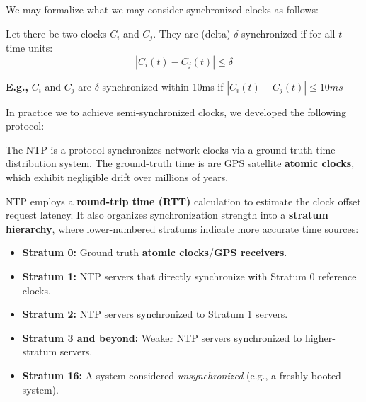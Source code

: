 \noindent
We may formalize what we may consider synchronized clocks as follows:
\begin{Def}
    
    Let there be two clocks $C_i$ and $C_j$. They are (delta) $\delta$-synchronized if for all $t$ time units:
    \[ |C_i(t) - C_j(t)| \leq \delta \]

    \noindent
    \textbf{E.g.,} $C_i$ and $C_j$ are $\delta$-synchronized within 10ms if $|C_i(t) - C_j(t)| \leq 10ms$
\end{Def}

\newpage 

\noindent
In practice we to achieve semi-synchronized clocks, we developed the following protocol:

\begin{Def}
    
    The NTP is a protocol synchronizes network clocks via a ground-truth time distribution system.
    The ground-truth time is are GPS satellite \textbf{atomic clocks}, which exhibit negligible drift over millions of years.

    NTP employs a \textbf{round-trip time (RTT)} calculation to estimate the clock offset request latency. 
    It also organizes synchronization strength into a \textbf{stratum hierarchy}, where lower-numbered stratums indicate more accurate time sources:

    \begin{itemize}
        \item \textbf{Stratum 0:} Ground truth \textbf{atomic clocks}/\textbf{GPS receivers}.
        \item \textbf{Stratum 1:} NTP servers that directly synchronize with Stratum 0 reference clocks.
        \item \textbf{Stratum 2:} NTP servers synchronized to Stratum 1 servers.
        \item \textbf{Stratum 3 and beyond:} Weaker NTP servers synchronized to higher-stratum servers.
        \item \textbf{Stratum 16:} A system considered \textit{unsynchronized} (e.g., a freshly booted system).
    \end{itemize}
\end{Def}

